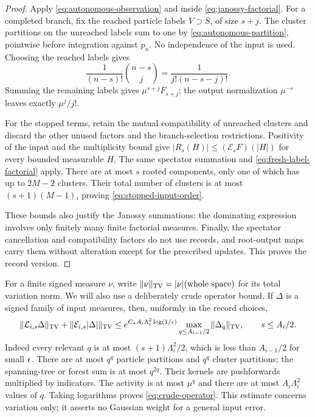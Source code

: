 \begin{proof}
Apply \eqref{eq:autonomous-observation} and
 inside \eqref{eq:janossy-factorial}.  For a
completed branch, fix the reached particle labels $V\supset S$, of size
$s+j$.  The cluster partitions on the unreached labels sum to one by
\eqref{eq:autonomous-partition}, pointwise before integration against
$p_n$.  No independence of the input is used.  Choosing the reached
labels gives
\begin{equation}\label{eq:fresh-label-factorial}
 \frac{1}{(n-s)!}\binom{n-s}{j}
      =\frac{1}{j!(n-s-j)!}.
\end{equation}
Summing the remaining labels gives $\mu^{s+j}F_{s+j}$; the output
normalization $\mu^{-s}$ leaves exactly $\mu^j/j!$.

For the stopped terms, retain the mutual compatibility of unreached
clusters and discard the other unused factors and the branch-selection
restrictions.  Positivity of the input and the multiplicity bound give
$|R_s(H)|\le(\mathcal E_sF)(|H|)$ for every bounded measurable $H$.
The same spectator summation and \eqref{eq:fresh-label-factorial} apply.
There are at most $s$ rooted components, only one of which has up to
$2M-2$ clusters.  Their total number of clusters is at most
$(s+1)(M-1)$, proving \eqref{eq:stopped-input-order}.

These bounds also justify the Janossy summations: the dominating
expression involves only finitely many finite factorial measures.
Finally, the spectator cancellation and compatibility factors do not
use records, and root-output maps carry them without alteration except
for the prescribed updates.  This proves the record version.
\end{proof}

For a finite signed measure $\nu$, write
$\|\nu\|_{\mathrm{TV}}=|\nu|(\text{whole space})$ for its total variation norm.
We will also use a deliberately crude operator bound.  If $\Delta$ is a
signed family of input measures, then, uniformly in the record choices,
\begin{equation}\label{eq:crude-operator}
 \|\mathcal L_{i,s}\Delta\|_{\mathrm{TV}}
 +\|\mathcal E_{i,s}|\Delta|\|_{\mathrm{TV}}
 \le e^{C_*A_i\Lambda_i^2\log(1/\epsilon)}
       \max_{q\le A_{i-1}/2}\|\Delta_q\|_{\mathrm{TV}},
 \qquad s\le A_i/2.
\end{equation}
Indeed every relevant $q$ is at most $(s+1)\Lambda_i^2/2$, which is less
than $A_{i-1}/2$ for small $\epsilon$.  There are at most $q^q$ particle
partitions and $q^q$ cluster partitions; the spanning-tree or forest
sum is at most $q^{2q}$.  Their kernels are pushforwards multiplied by
indicators.  The activity is at most $\mu^q$ and there are at most
$A_i\Lambda_i^2$ values of $q$.  Taking logarithms proves
\eqref{eq:crude-operator}.  This estimate concerns variation only; it
asserts no Gaussian weight for a general input error.

